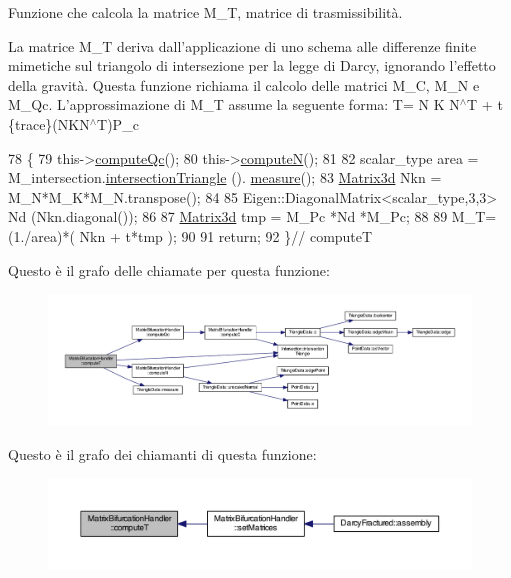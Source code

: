 Funzione che calcola la matrice M\-\_\-\-T, matrice di trasmissibilità. 

La matrice M\-\_\-\-T deriva dall'applicazione di uno schema alle differenze finite mimetiche sul triangolo di intersezione per la legge di Darcy, ignorando l'effetto della gravità. Questa funzione richiama il calcolo delle matrici M\-\_\-\-C, M\-\_\-\-N e M\-\_\-\-Qc. L'approssimazione di M\-\_\-\-T assume la seguente forma\-: T= N K N$^\wedge$\-T + t \{trace\}(N\-K\-N$^\wedge$\-T)P\-\_\-c 
\begin{DoxyCode}
78 \{
79     this->\hyperlink{classMatrixBifurcationHandler_a203b6bfcdef418ffa927aebaeedc6da2}{computeQc}();
80     this->\hyperlink{classMatrixBifurcationHandler_ac134a5731e6614e543241a018ccf8c34}{computeN}();
81 
82     scalar\_type area = M\_intersection.\hyperlink{classIntersection_a603d1cb4b33762c72999968ceec95a39}{intersectionTriangle} ().
      \hyperlink{classTriangleData_acbfbc62d5221ecd37437012fe8b68c8d}{measure}();
83     \hyperlink{Core_8h_acd816705c6602062b91975525c4e3f6f}{Matrix3d} Nkn = M\_N*M\_K*M\_N.transpose();
84     
85     Eigen::DiagonalMatrix<scalar\_type,3,3> Nd (Nkn.diagonal());
86     
87     \hyperlink{Core_8h_acd816705c6602062b91975525c4e3f6f}{Matrix3d} tmp = M\_Pc *Nd *M\_Pc;
88     
89     M\_T=(1./area)*( Nkn + t*tmp );
90     
91     \textcolor{keywordflow}{return};
92 \}\textcolor{comment}{// computeT}
\end{DoxyCode}


Questo è il grafo delle chiamate per questa funzione\-:\nopagebreak
\begin{figure}[H]
\begin{center}
\leavevmode
\includegraphics[width=350pt]{classMatrixBifurcationHandler_a46ee3c60eedda32abe36700ab2ce2d16_cgraph}
\end{center}
\end{figure}




Questo è il grafo dei chiamanti di questa funzione\-:\nopagebreak
\begin{figure}[H]
\begin{center}
\leavevmode
\includegraphics[width=350pt]{classMatrixBifurcationHandler_a46ee3c60eedda32abe36700ab2ce2d16_icgraph}
\end{center}
\end{figure}



